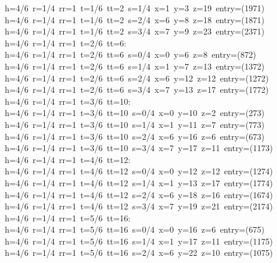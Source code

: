 \begin{tabbing}
h=4/6\ r=1/4\ rr=1\ t=1/6\ tt=2\ s=1/4\ x=1\ y=3\ z=19\ entry=(1971)\\[0pt]
h=4/6\ r=1/4\ rr=1\ t=1/6\ tt=2\ s=2/4\ x=6\ y=8\ z=18\ entry=(1871)\\[0pt]
h=4/6\ r=1/4\ rr=1\ t=1/6\ tt=2\ s=3/4\ x=7\ y=9\ z=23\ entry=(2371)\\[0pt]
h=4/6\ r=1/4\ rr=1\ t=2/6\ tt=6:\\[0pt]
h=4/6\ r=1/4\ rr=1\ t=2/6\ tt=6\ s=0/4\ x=0\ y=6\ z=8\ entry=(872)\\[0pt]
h=4/6\ r=1/4\ rr=1\ t=2/6\ tt=6\ s=1/4\ x=1\ y=7\ z=13\ entry=(1372)\\[0pt]
h=4/6\ r=1/4\ rr=1\ t=2/6\ tt=6\ s=2/4\ x=6\ y=12\ z=12\ entry=(1272)\\[0pt]
h=4/6\ r=1/4\ rr=1\ t=2/6\ tt=6\ s=3/4\ x=7\ y=13\ z=17\ entry=(1772)\\[0pt]
h=4/6\ r=1/4\ rr=1\ t=3/6\ tt=10:\\[0pt]
h=4/6\ r=1/4\ rr=1\ t=3/6\ tt=10\ s=0/4\ x=0\ y=10\ z=2\ entry=(273)\\[0pt]
h=4/6\ r=1/4\ rr=1\ t=3/6\ tt=10\ s=1/4\ x=1\ y=11\ z=7\ entry=(773)\\[0pt]
h=4/6\ r=1/4\ rr=1\ t=3/6\ tt=10\ s=2/4\ x=6\ y=16\ z=6\ entry=(673)\\[0pt]
h=4/6\ r=1/4\ rr=1\ t=3/6\ tt=10\ s=3/4\ x=7\ y=17\ z=11\ entry=(1173)\\[0pt]
h=4/6\ r=1/4\ rr=1\ t=4/6\ tt=12:\\[0pt]
h=4/6\ r=1/4\ rr=1\ t=4/6\ tt=12\ s=0/4\ x=0\ y=12\ z=12\ entry=(1274)\\[0pt]
h=4/6\ r=1/4\ rr=1\ t=4/6\ tt=12\ s=1/4\ x=1\ y=13\ z=17\ entry=(1774)\\[0pt]
h=4/6\ r=1/4\ rr=1\ t=4/6\ tt=12\ s=2/4\ x=6\ y=18\ z=16\ entry=(1674)\\[0pt]
h=4/6\ r=1/4\ rr=1\ t=4/6\ tt=12\ s=3/4\ x=7\ y=19\ z=21\ entry=(2174)\\[0pt]
h=4/6\ r=1/4\ rr=1\ t=5/6\ tt=16:\\[0pt]
h=4/6\ r=1/4\ rr=1\ t=5/6\ tt=16\ s=0/4\ x=0\ y=16\ z=6\ entry=(675)\\[0pt]
h=4/6\ r=1/4\ rr=1\ t=5/6\ tt=16\ s=1/4\ x=1\ y=17\ z=11\ entry=(1175)\\[0pt]
h=4/6\ r=1/4\ rr=1\ t=5/6\ tt=16\ s=2/4\ x=6\ y=22\ z=10\ entry=(1075)\\[0pt]

\end{tabbing}

